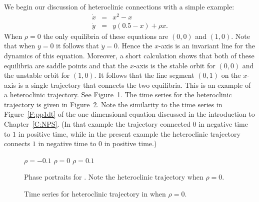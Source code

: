 We begin our discussion of heteroclinic connections with a simple example:
\begin{equation*} \label{e:hetero}
\begin{array}{rcl}
\dot{x} & = &  x^2-x  \\
\dot{y} & = &  y(0.5-x) + \rho x.
\end{array}
\end{equation*}
When $\rho=0$ the only equilibria of these equations are $(0,0)$ and 
$(1,0)$.  Note that when $y=0$ it follows that $\dot{y}=0$.  Hence
the $x$-axis is an invariant line for the dynamics of this equation. 
Moreover, a short calculation shows that both of these equilibria are 
saddle points and that the $x$-axis is the stable orbit for $(0,0)$
and the unstable orbit for $(1,0)$.  
It follows that the line segment 
$(0,1)$ on the $x$-axis is a single trajectory that connects the two
equilibria.  This is an example of a heteroclinic trajectory. See
Figure~\ref{F:hetero}.  The time series for the heteroclinic trajectory 
is given in Figure~\ref{F:heteroT}.  Note the similarity to the time 
series in Figure~\ref{F:pp1dt} of the one dimensional equation 
 discussed in the introduction to Chapter~\ref{C:NPS}. (In 
that example the trajectory connected $0$ in negative time to $1$ in positive
time, while in the present example the heteroclinic trajectory connects
$1$ in negative time to $0$ in positive time.)

\begin{figure}[htb]
           \centerline{%
	   }
 	\vspace*{-0.2in}
	\hspace{0.3in} $\rho=-0.1$  \hspace{1.7in} $\rho=0$
		\hspace{1.8in} $\rho=0.1$ 
           \caption{Phase portraits for \protect{}. 
	Note the heteroclinic trajectory when $\rho=0$.}
           \label{F:hetero}
\end{figure}

\begin{figure}[htb]
           \centerline{%
	   }
           \caption{Time series for heteroclinic trajectory 
		in \protect{} when $\rho=0$.}
           \label{F:heteroT}
\end{figure}

